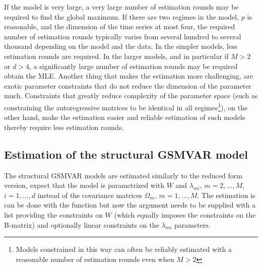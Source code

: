 \documentclass[nojss]{jss} %
\begin{document}
If the model is very large, a very large number of estimation rounds may be required to find the global maximum. If there are two regimes in the model, $p$ is reasonable, and the dimension of the time series at most four, the required number of estimation rounds typically varies from several hundred to several thousand depending on the model and the data. In the simpler models, less estimation rounds are required. In the larger models, and in particular if $M>2$ or $d>4$, a significantly large number of estimation rounds may be required obtain the MLE. Another thing that makes the estimation more challenging, are exotic parameter constraints that do not reduce the dimension of the parameter much. Constraints that greatly reduce complexity of the parameter space (such as constraining the autoregressive matrices to be identical in all regimes\footnote{Models constrained in this way can often be reliably estimated with a reasonable number of estimation rounds even when $M>2$}), on the other hand, make the estimation easier and reliable estimation of such models thereby require less estimation rounds.

\subsection{Estimation of the structural GSMVAR model}\label{sec:estim_structural}
The structural GSMVAR models are estimated similarly to the reduced form version, expect that the model is parametrized with $W$ and $\lambda_{mi}$, $m=2,...,M$, $i=1,...,d$ instead of the covariance matrices $\Omega_{m}$, $m=1,...,M$. The estimation is can be done with the function  but now the argument  needs to be supplied with a list providing the constraints on $W$ (which equally imposes the constraints on the B-matrix) and optionally linear constraints on the $\lambda_{mi}$ parameters.
\end{document}
